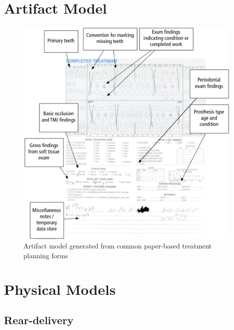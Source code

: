 \documentclass[11pt]{article}
\begin{document}
\section{Artifact Model}
\label{artifact}
\begin{figure}[h!b]
\begin{center}
\includegraphics[width=\textwidth]{artifactmodel.png}
\end{center}
\caption{Artifact model generated from common paper-based treatment planning forms}
\end{figure}
\newpage

\section{Physical Models}
\label{physical}
\subsection{Rear-delivery}
\end{document}
